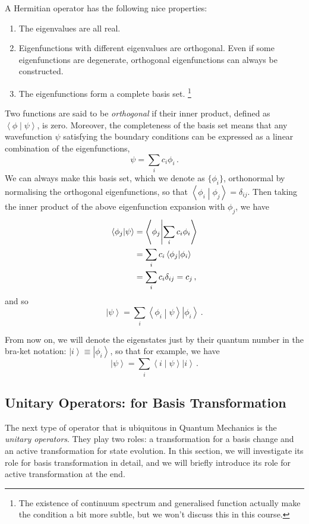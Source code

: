 \documentclass{article}
\theoremstyle{plain}\theoremheaderfont{\normalfont\itshape}\theorembodyfont{\rmfamily}\theoremseparator{.}\newtheorem*{rem}{Remark}\newtheorem*{ex}{Example}\newtheorem*{proof}{Proof}\newtheorem*{altp}{Alternative proof}
\theoremstyle{plain}\theoremheaderfont{\normalfont\bfseries}\theorembodyfont{\rmfamily}\theoremseparator{.}\newtheorem{thm}{Theorem}[section]\newtheorem{lem}[thm]{Lemma}\newtheorem{prop}[thm]{Proposition}\newtheorem*{cor}{Corollary}\newtheorem{defn}[thm]{Definition}\newtheorem{clm}[thm]{Claim}\newtheorem{clminproof}{Claim}
\theoremstyle{break}\theoremheaderfont{\normalfont\itshape}\theorembodyfont{\rmfamily}\theoremseparator{.\medskip}\newtheorem*{proofskip}{Proof}\newtheorem*{exs}{Examples}\newtheorem*{rems}{Remarks}
\theoremstyle{break}\theoremheaderfont{\normalfont\bfseries}\theorembodyfont{\rmfamily}\theoremseparator{.\medskip}\newtheorem{lemskip}[thm]{Lemma}\newtheorem{defnskip}[thm]{Definition}\newtheorem{propskip}[thm]{Proposition}\newtheorem{thmskip}[thm]{Theorem}
\numberwithin{equation}{section}
\newcommand{\ket}[1]{\left| #1 \right\rangle}
\newcommand{\braket}[2]{\left\langle #1 \middle| #2 \right\rangle}
\begin{document}
    A Hermitian operator has the following nice properties:
    \begin{enumerate}[topsep=0pt,label=(\roman*)]
        \item The eigenvalues are all real.
        \item Eigenfunctions with different eigenvalues are orthogonal. Even if some eigenfunctions are degenerate, orthogonal eigenfunctions can always be constructed.
        \item The eigenfunctions form a complete basis set. \footnote{The existence of continuum spectrum and generalised function actually make the condition a bit more subtle, but we won't discuss this in this course.}
    \end{enumerate}
    Two functions are said to be \textit{orthogonal} if their inner product, defined as \(\braket{\phi}{\psi}\), is zero. Moreover, the completeness of the basis set means that any wavefunction \(\psi\) satisfying the boundary conditions can be expressed as a linear combination of the eigenfunctions,
    \begin{equation}
        \psi=\sum_i c_i\phi_i\,.
    \end{equation}
    We can always make this basis set, which we denote as \(\{\phi_i\}\), orthonormal by normalising the orthogonal eigenfunctions, so that \(\braket{\phi_i}{\phi_j}=\delta_{ij}\). Then taking the inner product of the above eigenfunction expansion with \(\phi_j\), we have
    \begin{align}
        \braket{\phi_j}{\psi}&=\braket{\phi_j}{\sum_i c_i\phi_i}\notag\\
        &=\sum_i c_i\braket{\phi_j}{\phi_i}\notag\\
        &=\sum_i c_i\delta_{ij}=c_j\,,
    \end{align}
    and so
    \begin{equation}
        \ket{\psi}=\sum_i \braket{\phi_i}{\psi}\ket{\phi_i}\,.
    \end{equation}

    From now on, we will denote the eigenstates just by their quantum number in the bra-ket notation: \(\ket{i}\equiv\ket{\phi_i}\), so that for example, we have
    \begin{equation}
        \ket{\psi}=\sum_i\braket{i}{\psi}\ket{i}\,.
    \end{equation}

    \subsection{Unitary Operators: for Basis Transformation}
    The next type of operator that is ubiquitous in Quantum Mechanics is the \textit{unitary operators}. They play two roles: a transformation for a basis change and an active transformation for state evolution. In this section, we will investigate its role for basis transformation in detail, and we will briefly introduce its role for active transformation at the end.
\end{document}
